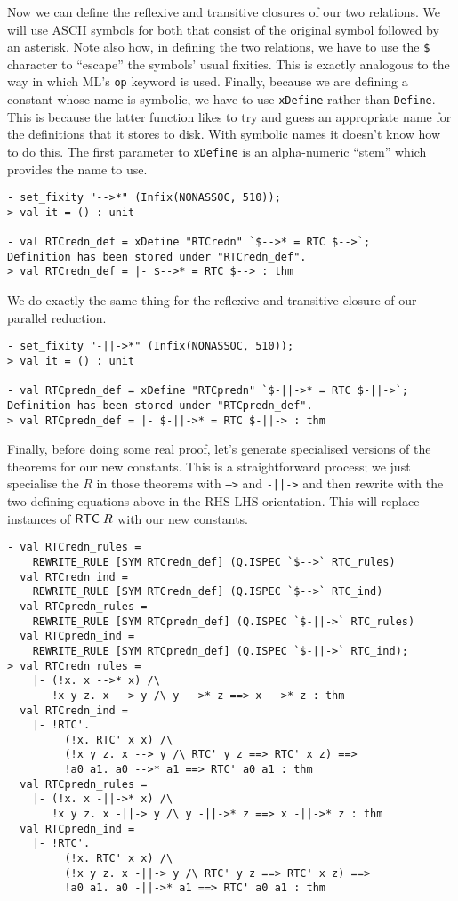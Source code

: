 Now we can define the reflexive and transitive closures of our two
relations.  We will use ASCII symbols for both that consist of the
original symbol followed by an asterisk.  Note also how, in
defining the two relations, we have to use the \texttt{\$} character
to ``escape'' the symbols' usual fixities.  This is exactly analogous
to the way in which ML's \texttt{op} keyword is used.  Finally,
because we are defining a constant whose name is symbolic, we have to
use \texttt{xDefine} rather than \texttt{Define}.  This is because the
latter function likes to try and guess an appropriate name for the
definitions that it stores to disk.  With symbolic names it doesn't
know how to do this.  The first parameter to \texttt{xDefine} is an
alpha-numeric ``stem'' which provides the name to use.
\begin{session}
\begin{verbatim}
- set_fixity "-->*" (Infix(NONASSOC, 510));
> val it = () : unit

- val RTCredn_def = xDefine "RTCredn" `$-->* = RTC $-->`;
Definition has been stored under "RTCredn_def".
> val RTCredn_def = |- $-->* = RTC $--> : thm
\end{verbatim}
\end{session}
We do exactly the same thing for the reflexive and transitive closure
of our parallel reduction.
\begin{session}
\begin{verbatim}
- set_fixity "-||->*" (Infix(NONASSOC, 510));
> val it = () : unit

- val RTCpredn_def = xDefine "RTCpredn" `$-||->* = RTC $-||->`;
Definition has been stored under "RTCpredn_def".
> val RTCpredn_def = |- $-||->* = RTC $-||-> : thm
\end{verbatim}
\end{session}
Finally, before doing some real proof, let's generate specialised
versions of the  theorems for our new constants.  This is a
straightforward process; we just specialise the $R$ in those theorems
with \texttt{-->} and \texttt{-||->} and then rewrite with the two
defining equations above in the RHS-LHS orientation.  This will
replace instances of ${\sf RTC}\;R$ with our new constants.
\begin{session}
\begin{verbatim}
- val RTCredn_rules =
    REWRITE_RULE [SYM RTCredn_def] (Q.ISPEC `$-->` RTC_rules)
  val RTCredn_ind =
    REWRITE_RULE [SYM RTCredn_def] (Q.ISPEC `$-->` RTC_ind)
  val RTCpredn_rules =
    REWRITE_RULE [SYM RTCpredn_def] (Q.ISPEC `$-||->` RTC_rules)
  val RTCpredn_ind =
    REWRITE_RULE [SYM RTCpredn_def] (Q.ISPEC `$-||->` RTC_ind);
> val RTCredn_rules =
    |- (!x. x -->* x) /\
       !x y z. x --> y /\ y -->* z ==> x -->* z : thm
  val RTCredn_ind =
    |- !RTC'.
         (!x. RTC' x x) /\
         (!x y z. x --> y /\ RTC' y z ==> RTC' x z) ==>
         !a0 a1. a0 -->* a1 ==> RTC' a0 a1 : thm
  val RTCpredn_rules =
    |- (!x. x -||->* x) /\
       !x y z. x -||-> y /\ y -||->* z ==> x -||->* z : thm
  val RTCpredn_ind =
    |- !RTC'.
         (!x. RTC' x x) /\
         (!x y z. x -||-> y /\ RTC' y z ==> RTC' x z) ==>
         !a0 a1. a0 -||->* a1 ==> RTC' a0 a1 : thm
\end{verbatim}
\end{session}
